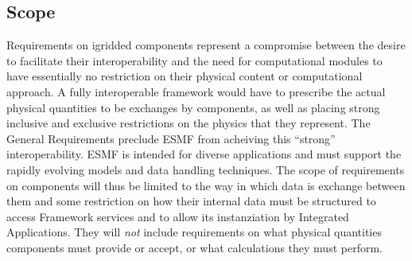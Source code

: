 \subsection{Scope}



Requirements on igridded components represent a compromise between
the desire to facilitate their interoperability and the need for
computational modules to have essentially no restriction on their
physical content or computational approach.
A fully interoperable framework would
have to prescribe the actual physical quantities to be exchanges
by components, as well as placing strong inclusive and exclusive 
restrictions on the physics that they represent. The General Requirements
 preclude ESMF from acheiving this  ``strong'' interoperability.
ESMF is intended for  diverse
applications and must support  the rapidly  evolving 
models and data handling techniques.
The scope of requirements on components will thus be limited to the
way in which data is exchange between them and some restriction
on how their internal data must be structured to access Framework
services and to allow its instanziation by Integrated Applications.
They will {\em not} include requirements on what physical quantities
components must provide or accept, or what calculations they
must perform.

















